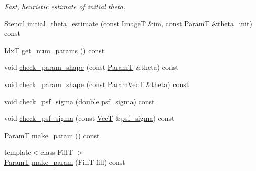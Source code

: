 \begin{DoxyCompactItemize}
\begin{DoxyCompactList}\small\item\em Fast, heuristic estimate of initial theta. \end{DoxyCompactList}\item 
\hyperlink{classmappel_1_1Gauss1DModel_1_1Stencil}{Stencil} \hyperlink{classmappel_1_1Gauss1DModel_a4c4e01a489a6d8f7b119dd50b51610c2}{initial\+\_\+theta\+\_\+estimate} (const \hyperlink{classmappel_1_1ImageFormat1DBase_a521a1ff391a52a636fac4aac7c7ba02c}{ImageT} \&im, const \hyperlink{classmappel_1_1PointEmitterModel_a665ec6aea3aac139bb69a23c06d4b9a1}{ParamT} \&theta\+\_\+init) const 
\item 
\hyperlink{namespacemappel_ab17ec0f30b61ece292439d7ece81d3a8}{IdxT} \hyperlink{classmappel_1_1PointEmitterModel_a6fe8129bd24ab5c6620b3ab106b6c91a}{get\+\_\+num\+\_\+params} () const 
\item 
void \hyperlink{classmappel_1_1PointEmitterModel_a97a868e842302f670ed9f9bd49416771}{check\+\_\+param\+\_\+shape} (const \hyperlink{classmappel_1_1PointEmitterModel_a665ec6aea3aac139bb69a23c06d4b9a1}{ParamT} \&theta) const 
\item 
void \hyperlink{classmappel_1_1PointEmitterModel_a54b341a9bc0e32e2c8bbfe4ec0d8c9a1}{check\+\_\+param\+\_\+shape} (const \hyperlink{classmappel_1_1PointEmitterModel_add253b568d763f1513a810aac35de719}{Param\+VecT} \&theta) const 
\item 
void \hyperlink{classmappel_1_1PointEmitterModel_a01ce8d6358acbd2575be519dff1df89b}{check\+\_\+psf\+\_\+sigma} (double \hyperlink{classmappel_1_1Gauss1DModel_a62c6b2a5d8ab5f5596504a19daed66b2}{psf\+\_\+sigma}) const 
\item 
void \hyperlink{classmappel_1_1PointEmitterModel_a85780ca544a5ef5e0a62e74005081677}{check\+\_\+psf\+\_\+sigma} (const \hyperlink{namespacemappel_a2225ad69f358daa3f4f99282a35b9a3a}{VecT} \&\hyperlink{classmappel_1_1Gauss1DModel_a62c6b2a5d8ab5f5596504a19daed66b2}{psf\+\_\+sigma}) const 
\item 
\hyperlink{classmappel_1_1PointEmitterModel_a665ec6aea3aac139bb69a23c06d4b9a1}{ParamT} \hyperlink{classmappel_1_1PointEmitterModel_a1cd8ff64ce4132b6eaa8655696885749}{make\+\_\+param} () const 
\item 
{\footnotesize template$<$class FillT $>$ }\\\hyperlink{classmappel_1_1PointEmitterModel_a665ec6aea3aac139bb69a23c06d4b9a1}{ParamT} \hyperlink{classmappel_1_1PointEmitterModel_a5638e3df26cf84d7cf0f23112132682e}{make\+\_\+param} (FillT fill) const 

\end{DoxyCompactItemize}
